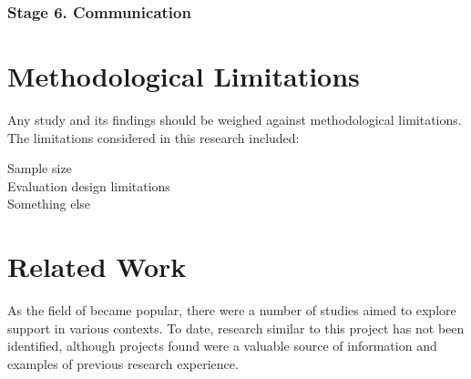 \subsubsection{Stage 6. Communication}

\section{Methodological Limitations}
\label{sec:limits}

Any study and its findings should be weighed against methodological limitations.
The limitations considered in this research included:

\begin{description}
\item[Sample size]
\item[Evaluation design limitations]
\item[Something else]
\end{description}



\section{Related Work}
\label{sec:related}
As the field of \LLLs became popular, there were a number of studies aimed to
explore \LLLs support in various contexts. To date, research similar to this
project has not been identified, although projects found were a valuable source
of information and examples of previous research experience.


